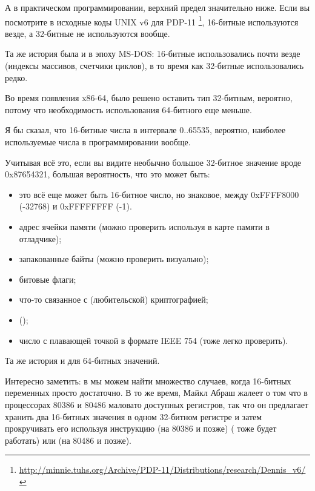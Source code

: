 А в практическом программировании, верхний предел значительно ниже.
Если вы посмотрите в исходные коды UNIX v6 для PDP-11
\footnote{\url{http://minnie.tuhs.org/Archive/PDP-11/Distributions/research/Dennis_v6/}},
16-битные  используются везде, а 32-битные  не используются вообще.

Та же история была и в эпоху MS-DOS: 16-битные  использовались почти везде (индексы массивов, счетчики циклов),
в то время как 32-битные  использовались редко.

Во время появления x86-64, было решено оставить тип  32-битным, вероятно, потому что 
необходимость использования 64-битного  еще меньше.

Я бы сказал, что 16-битные числа в интервале 0..65535, вероятно, наиболее используемые числа в программировании вообще.

Учитывая всё это, если вы видите необычно большое 32-битное значение вроде 0x87654321, большая вероятность,
что это может быть:

\begin{itemize}

\item это всё еще может быть 16-битное число, но знаковое, между 0xFFFF8000 (-32768) и 0xFFFFFFFF (-1).
\item адрес ячейки памяти (можно проверить используя в карте памяти в отладчике);
\item запакованные байты (можно проверить визуально);
\item битовые флаги;
\item что-то связанное с (любительской) криптографией;
\item {} ();
\item число с плавающей точкой в формате IEEE 754 (тоже легко проверить).

\end{itemize}

Та же история и для 64-битных значений.


Интересно заметить: в 
мы можем найти множество случаев, когда 16-битных переменных просто достаточно.
В то же время, Майкл Абраш жалеет о том что в процессорах 80386 и 80486 маловато доступных регистров,
так что он предлагает хранить два 16-битных значения в одном 32-битном регистре и затем прокручивать его 
используя инструкцию  (на 80386 и позже) ( тоже будет работать) или
 (на 80486 и позже).

